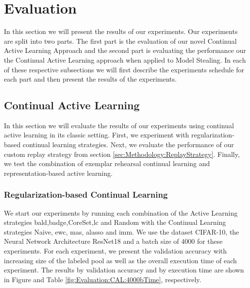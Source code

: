 
\chapter{Evaluation}
\label{ch:Evaluation}

In this section we will present the results of our experiments. Our experiments are split into two parts. The first part is the evaluation of our novel
Continual Active Learning Approach and the second part is evaluating the performance our the Continual Active Learning approach when applied to Model Stealing.
In each of these respective subsections we will first describe the experiments schedule for each part and then present the results of the experiments.



\section{Continual Active Learning}
\label{sec:CAL}
In this section we will evaluate the results of our experiments using continual active learning in its classic setting. First, we experiment with regularization-based
continual learning strategies. Next, we evaluate the performance of our custom replay strategy from section \ref{sec:Methodology:ReplayStrategy}. Finally, we
test the combination of exemplar rehearsal continual learning and representation-based active learning.

\subsection{Regularization-based Continual Learning}
\label{sec:Evaluation:Results:CAL:ALRegCL}
We start our experiments by running each combination of the Active Learning strategies \gls{bald},\gls{badge},CoreSet,\gls{lc} and Random with the Continual Learning
strategies Naive, \gls{ewc}, \gls{mas}, \gls{alasso} and \gls{imm}. We use the dataset CIFAR-10, the Neural Network Architecture ResNet18 and a batch size of 4000 for these experiments. For each experiment,
we present the validation accuracy with increasing size of the labeled pool as well as the overall execution time of each experiment. The results by validation accuracy and by execution time are shown in 
Figure \cite{fig:Evaluation:CAL:4000bAcc} and Table \ref{fig:Evaluation:CAL:4000bTime}, respectively.\par

